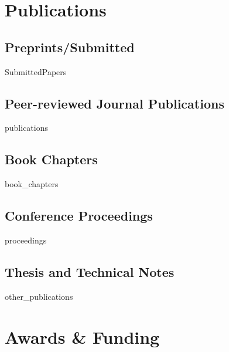 \documentclass[11pt,a4paper,sans]{moderncv}
\begin{document}
\section{ Publications}

\subsection{Preprints/Submitted}
\begin{btSect}[unsrt]{SubmittedPapers}
\btPrintAll
\end{btSect}

\subsection{Peer-reviewed Journal Publications}
\begin{btSect}[unsrt]{publications}
\btPrintAll
\end{btSect}

\subsection{Book Chapters}
\begin{btSect}[unsrt]{book_chapters}
\btPrintAll
\end{btSect}

\subsection{Conference Proceedings}
\begin{btSect}[unsrt]{proceedings}
\btPrintAll
\end{btSect}

\subsection{Thesis and Technical Notes}
\begin{btSect}[unsrt]{other_publications}
\btPrintAll
\end{btSect}

\section{ Awards \& Funding}
\end{document}
